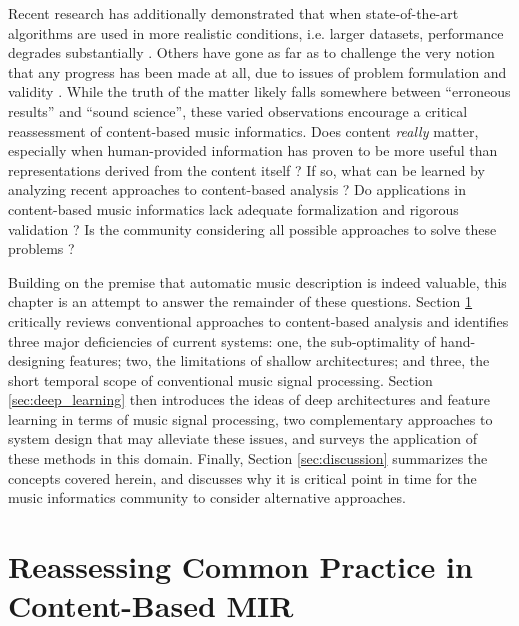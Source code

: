Recent research has additionally demonstrated that when state-of-the-art algorithms are used in more realistic conditions, i.e. larger datasets, performance degrades substantially \cite{BertinMahieux2012Largescale}.
Others have gone as far as to challenge the very notion that any progress has been made at all, due to issues of problem formulation and validity \cite{Sturm2014State}.
While the truth of the matter likely falls somewhere between ``erroneous results'' and ``sound science'', these varied observations encourage a critical reassessment of content-based music informatics.
Does content \emph{really} matter, especially when human-provided information has proven to be more useful than representations derived from the content itself \cite{Slaney2011Webscale}?
If so, what can be learned by analyzing recent approaches to content-based analysis \cite{Flexer2012MIREX}?
Do applications in content-based music informatics lack adequate formalization and rigorous validation \cite{Sturm2014Kiki}?
Is the community considering all possible approaches to solve these problems \cite{Humphrey2012Moving}?

Building on the premise that automatic music description is indeed valuable, this chapter is an attempt to answer the remainder of these questions.
Section \ref{sec:common} critically reviews conventional approaches to content-based analysis and identifies three major deficiencies of current systems:
one, the sub-optimality of hand-designing features;
two, the limitations of shallow architectures;
and three, the short temporal scope of conventional music signal processing.
Section \ref{sec:deep_learning} then introduces the ideas of deep architectures and feature learning in terms of music signal processing, two complementary approaches to system design that may alleviate these issues, and surveys the application of these methods in this domain.
Finally, Section \ref{sec:discussion} summarizes the concepts covered herein, and discusses why it is critical point in time for the music informatics community to consider alternative approaches.


\section{Reassessing Common Practice in Content-Based MIR}
\label{sec:common}

